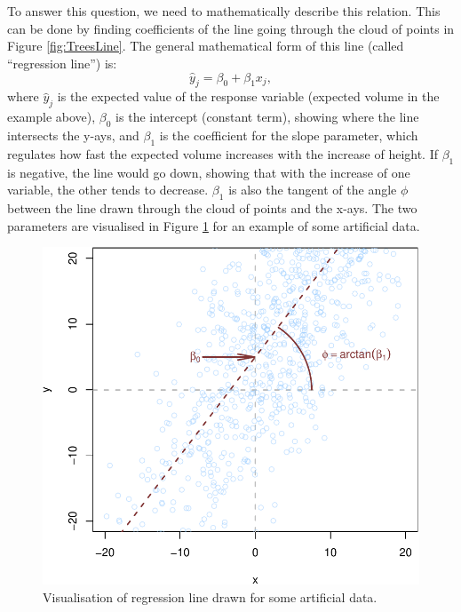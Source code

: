 \documentclass[
]{book}
\theoremstyle{definition}
\theoremstyle{definition}
\theoremstyle{definition}
\theoremstyle{definition}
\theoremstyle{remark}
\begin{document}
To answer this question, we need to mathematically describe this relation. This can be done by finding coefficients of the line going through the cloud of points in Figure \ref{fig:TreesLine}. The general mathematical form of this line (called ``regression line'') is:
\begin{equation}
    \hat{y}_j = \beta_0 + \beta_1 x_j,
    \label{eq:SLRLineFormula}
\end{equation}
where \(\hat{y}_j\) is the expected value of the response variable (expected volume in the example above), \(\beta_0\) is the intercept (constant term), showing where the line intersects the y-ays, and \(\beta_1\) is the coefficient for the slope parameter, which regulates how fast the expected volume increases with the increase of height. If \(\beta_1\) is negative, the line would go down, showing that with the increase of one variable, the other tends to decrease. \(\beta_1\) is also the tangent of the angle \(\phi\) between the line drawn through the cloud of points and the x-ays. The two parameters are visualised in Figure \ref{fig:regressionVisuals} for an example of some artificial data.

\begin{figure}
\centering
\includegraphics{Svetunkov---Statistics-for-Business-Analytics_files/figure-latex/regressionVisuals-1.pdf}
\caption{\label{fig:regressionVisuals}Visualisation of regression line drawn for some artificial data.}
\end{figure}
\end{document}
